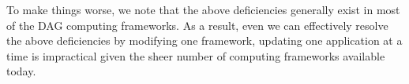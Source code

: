 To make things worse, we note that the above deficiencies generally exist in most of the DAG computing frameworks. 
As a result, even we can effectively resolve the above deficiencies by modifying one framework, updating one application at a time is impractical given the sheer number of computing frameworks available today.








